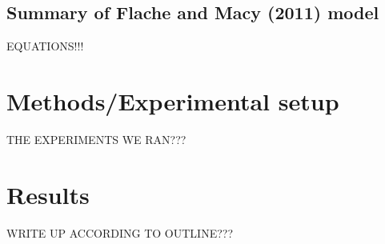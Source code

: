 \documentclass[11pt,letterpaper]{article}
\begin{document}
\subsection{Summary of Flache and Macy (2011) model}

EQUATIONS!!!

\section{Methods/Experimental setup}
\label{sec:methods}

THE EXPERIMENTS WE RAN???

\section{Results}

WRITE UP ACCORDING TO OUTLINE???






\end{document}
